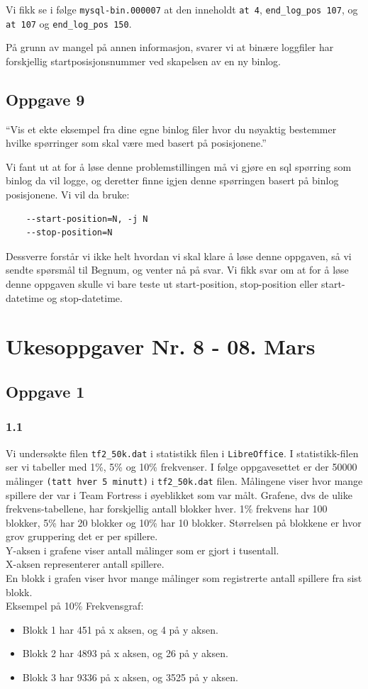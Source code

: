 \documentclass[a4paper, norsk, 12pt]{article}
\begin{document}
Vi fikk se i følge \verb|mysql-bin.000007| at den inneholdt \verb|at 4|, \verb|end_log_pos 107|, og \verb|at 107| og \verb|end_log_pos 150|.


På grunn av mangel på annen informasjon, svarer vi at binære loggfiler har forskjellig startposisjonsnummer ved skapelsen av en ny binlog.
\subsection{Oppgave 9}
“Vis et ekte eksempel fra dine egne binlog filer hvor du nøyaktig bestemmer hvilke spørringer som skal være med basert på posisjonene.”

Vi fant ut at for å løse denne problemstillingen må vi gjøre en sql spørring som binlog da vil logge, og deretter finne igjen denne spørringen basert på binlog posisjonene. Vi vil da bruke:
\begin{verbatim}
    --start-position=N, -j N
    --stop-position=N
\end{verbatim}

Dessverre forstår vi ikke helt hvordan vi skal klare å løse denne oppgaven, så vi sendte spørsmål til Begnum, og venter nå på svar. Vi fikk svar om at for å løse denne oppgaven skulle vi bare teste ut start-position, stop-position eller start-datetime og stop-datetime.

\section{Ukesoppgaver Nr. 8 - 08. Mars}
\subsection{Oppgave 1}
\subsubsection*{1.1}
Vi undersøkte filen \verb|tf2_50k.dat| i statistikk filen i \verb|LibreOffice|. I statistikk-filen ser vi tabeller med 1\%, 5\% og 10\% frekvenser. I følge oppgavesettet er der 50000 målinger \verb|(tatt hver 5 minutt)| i \verb|tf2_50k.dat| filen.  Målingene viser hvor mange spillere der var i Team Fortress i øyeblikket som var målt. Grafene, dvs de ulike frekvens-tabellene, har forskjellig antall blokker hver. 1\% frekvens har 100 blokker, 5\% har 20 blokker og 10\% har 10 blokker. Størrelsen på blokkene er hvor grov gruppering det er per spillere.\\

Y-aksen i grafene viser antall målinger som er gjort i tusentall.\\
X-aksen representerer antall spillere.\\
En blokk i grafen viser hvor mange målinger som registrerte antall spillere fra sist blokk.\\
Eksempel på 10\% Frekvensgraf:
\begin{itemize}
\item Blokk 1 har   451 på x aksen, og   4 på y aksen.
\item Blokk 2 har 4893 på x aksen, og 26 på y aksen.
\item Blokk 3 har 9336 på x aksen, og 3525 på y aksen.
\end{itemize}
\end{document}
